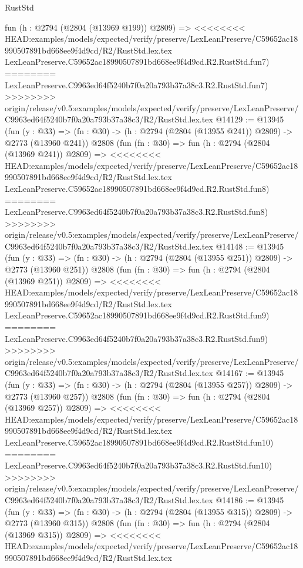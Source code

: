 \begin{lexlean}{RustStd}
\begin{coremodule}
{\begin{coremodule}
{{{{{{{{{{{{{{{{{{{{{{{{{{    fun (h : @2794 (@2804 (@13969 @199)) @2809) =>
<<<<<<<< HEAD:examples/models/expected/verify/preserve/LexLeanPreserve/C59652ac18990507891bd668ee9f4d9cd/R2/RustStd.lex.tex
    LexLeanPreserve.C59652ac18990507891bd668ee9f4d9cd.R2.RustStd.fun7)
========
    LexLeanPreserve.C9963ed64f5240b7f0a20a793b37a38c3.R2.RustStd.fun7)
>>>>>>>> origin/release/v0.5:examples/models/expected/verify/preserve/LexLeanPreserve/C9963ed64f5240b7f0a20a793b37a38c3/R2/RustStd.lex.tex
@14129 := @13945
    (fun (y : @33) => (fn : @30) -> (h : @2794 (@2804 (@13955 @241)) @2809) -> @2773 (@13960 @241))
    @2808
    (fun (fn : @30) =>
    fun (h : @2794 (@2804 (@13969 @241)) @2809) =>
<<<<<<<< HEAD:examples/models/expected/verify/preserve/LexLeanPreserve/C59652ac18990507891bd668ee9f4d9cd/R2/RustStd.lex.tex
    LexLeanPreserve.C59652ac18990507891bd668ee9f4d9cd.R2.RustStd.fun8)
========
    LexLeanPreserve.C9963ed64f5240b7f0a20a793b37a38c3.R2.RustStd.fun8)
>>>>>>>> origin/release/v0.5:examples/models/expected/verify/preserve/LexLeanPreserve/C9963ed64f5240b7f0a20a793b37a38c3/R2/RustStd.lex.tex
@14148 := @13945
    (fun (y : @33) => (fn : @30) -> (h : @2794 (@2804 (@13955 @251)) @2809) -> @2773 (@13960 @251))
    @2808
    (fun (fn : @30) =>
    fun (h : @2794 (@2804 (@13969 @251)) @2809) =>
<<<<<<<< HEAD:examples/models/expected/verify/preserve/LexLeanPreserve/C59652ac18990507891bd668ee9f4d9cd/R2/RustStd.lex.tex
    LexLeanPreserve.C59652ac18990507891bd668ee9f4d9cd.R2.RustStd.fun9)
========
    LexLeanPreserve.C9963ed64f5240b7f0a20a793b37a38c3.R2.RustStd.fun9)
>>>>>>>> origin/release/v0.5:examples/models/expected/verify/preserve/LexLeanPreserve/C9963ed64f5240b7f0a20a793b37a38c3/R2/RustStd.lex.tex
@14167 := @13945
    (fun (y : @33) => (fn : @30) -> (h : @2794 (@2804 (@13955 @257)) @2809) -> @2773 (@13960 @257))
    @2808
    (fun (fn : @30) =>
    fun (h : @2794 (@2804 (@13969 @257)) @2809) =>
<<<<<<<< HEAD:examples/models/expected/verify/preserve/LexLeanPreserve/C59652ac18990507891bd668ee9f4d9cd/R2/RustStd.lex.tex
    LexLeanPreserve.C59652ac18990507891bd668ee9f4d9cd.R2.RustStd.fun10)
========
    LexLeanPreserve.C9963ed64f5240b7f0a20a793b37a38c3.R2.RustStd.fun10)
>>>>>>>> origin/release/v0.5:examples/models/expected/verify/preserve/LexLeanPreserve/C9963ed64f5240b7f0a20a793b37a38c3/R2/RustStd.lex.tex
@14186 := @13945
    (fun (y : @33) => (fn : @30) -> (h : @2794 (@2804 (@13955 @315)) @2809) -> @2773 (@13960 @315))
    @2808
    (fun (fn : @30) =>
    fun (h : @2794 (@2804 (@13969 @315)) @2809) =>
<<<<<<<< HEAD:examples/models/expected/verify/preserve/LexLeanPreserve/C59652ac18990507891bd668ee9f4d9cd/R2/RustStd.lex.tex
}}}}}}}}}}}}}}}}}}}}}}}}}}
\end{coremodule}}
\end{coremodule}
\end{lexlean}

